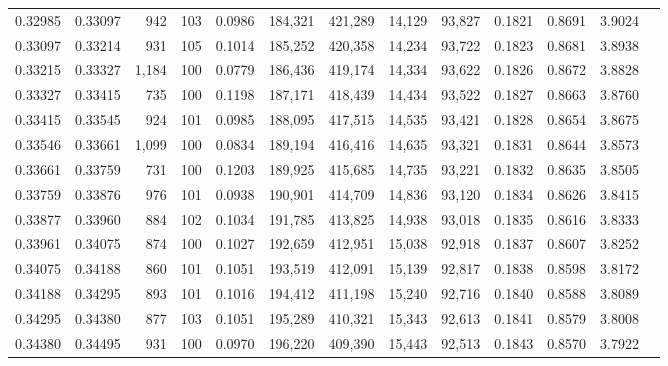 \begin{tabular}{rrrrrrrrrrrrr}
0.32985 & 0.33097 &   942 & 103 &                                     0.0986 & 184,321 & 421,289 &  14,129 &  93,827 & 0.1821 & 0.8691 & 3.9024 \\
0.33097 & 0.33214 &   931 & 105 &                                     0.1014 & 185,252 & 420,358 &  14,234 &  93,722 & 0.1823 & 0.8681 & 3.8938 \\
0.33215 & 0.33327 & 1,184 & 100 &                                     0.0779 & 186,436 & 419,174 &  14,334 &  93,622 & 0.1826 & 0.8672 & 3.8828 \\
0.33327 & 0.33415 &   735 & 100 &                                     0.1198 & 187,171 & 418,439 &  14,434 &  93,522 & 0.1827 & 0.8663 & 3.8760 \\
0.33415 & 0.33545 &   924 & 101 &                                     0.0985 & 188,095 & 417,515 &  14,535 &  93,421 & 0.1828 & 0.8654 & 3.8675 \\
0.33546 & 0.33661 & 1,099 & 100 &                                     0.0834 & 189,194 & 416,416 &  14,635 &  93,321 & 0.1831 & 0.8644 & 3.8573 \\
0.33661 & 0.33759 &   731 & 100 &                                     0.1203 & 189,925 & 415,685 &  14,735 &  93,221 & 0.1832 & 0.8635 & 3.8505 \\
0.33759 & 0.33876 &   976 & 101 &                                     0.0938 & 190,901 & 414,709 &  14,836 &  93,120 & 0.1834 & 0.8626 & 3.8415 \\
0.33877 & 0.33960 &   884 & 102 &                                     0.1034 & 191,785 & 413,825 &  14,938 &  93,018 & 0.1835 & 0.8616 & 3.8333 \\
0.33961 & 0.34075 &   874 & 100 &                                     0.1027 & 192,659 & 412,951 &  15,038 &  92,918 & 0.1837 & 0.8607 & 3.8252 \\
0.34075 & 0.34188 &   860 & 101 &                                     0.1051 & 193,519 & 412,091 &  15,139 &  92,817 & 0.1838 & 0.8598 & 3.8172 \\
0.34188 & 0.34295 &   893 & 101 &                                     0.1016 & 194,412 & 411,198 &  15,240 &  92,716 & 0.1840 & 0.8588 & 3.8089 \\
0.34295 & 0.34380 &   877 & 103 &                                     0.1051 & 195,289 & 410,321 &  15,343 &  92,613 & 0.1841 & 0.8579 & 3.8008 \\
0.34380 & 0.34495 &   931 & 100 &                                     0.0970 & 196,220 & 409,390 &  15,443 &  92,513 & 0.1843 & 0.8570 & 3.7922 \\

\end{tabular}
